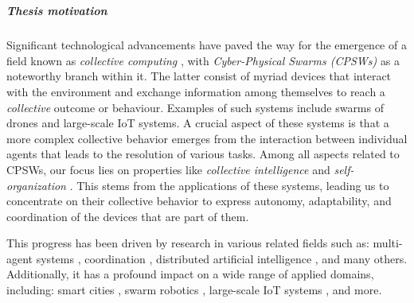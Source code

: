 \documentclass[12pt,a4paper,openright,twoside]{book}
\begin{document}
\tableofcontents   
\listoffigures     
\lstlistoflistings 

\mainmatter

\chapter{\introductionname}
\label{chap:introduction}


\paragraph{Thesis motivation}

Significant technological advancements have paved the way for the emergence of a field known as \emph{collective computing} 
    \cite{abowd2016beyond}, with \emph{Cyber-Physical Swarms (CPSWs)} \cite{schranz2021swarm} as a noteworthy branch within it.
    The latter consist of myriad devices that interact with the environment and exchange information among themselves
    to reach a \emph{collective} outcome or behaviour. Examples of such systems include swarms of drones and large-scale IoT systems.
    A crucial aspect of these systems is that a more complex collective behavior emerges from the interaction between 
    individual agents that leads to the resolution of various tasks.
    Among all aspects related to CPSWs, our focus lies on properties like \emph{collective intelligence} \cite{tumer2004survey} 
    and \emph{self-organization} \cite{schmeck2011organic}. This stems from the applications of these systems, leading us to 
    concentrate on their collective behavior to express autonomy, adaptability, and coordination of the devices 
    that are part of them.

This progress has been driven by research in various related fields such as: multi-agent systems \cite{dorri2018multi},
    coordination \cite{yang2022overview}, distributed artificial intelligence \cite{bond2014readings}, and many others. 
    Additionally, it has a profound impact on a wide range of applied domains, including: smart cities \cite{zedadra2019swarm}, 
    swarm robotics \cite{brambilla2013swarm}, large-scale IoT systems \cite{uslu2023role}, and more.
\end{document}

